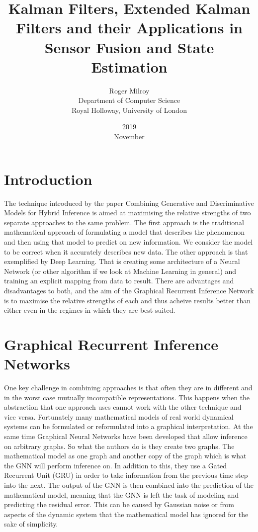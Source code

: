 \documentclass[]{article}
\begin{document}
\title{Kalman Filters, Extended Kalman Filters and their Applications in Sensor Fusion and State Estimation}
\date{2019\\ November}
\author{Roger Milroy\\ Department of Computer Science\\ Royal Holloway, University of London}

\maketitle

\section{Introduction}

The technique introduced by the paper Combining Generative and Discriminative Models for Hybrid Inference \cite{Satorras2019CombiningGA} is aimed at maximising the relative strengths of two separate approaches to the same problem.
The first approach is the traditional mathematical approach of formulating a model that describes the phenomenon and then using that model to predict on new information. We consider the model to be correct when it accurately describes new data.
The other approach is that exemplified by Deep Learning. That is creating some architecture of a Neural Network (or other algorithm if we look at Machine Learning in general) and training an explicit mapping from data to result.
There are advantages and disadvantages to both, and the aim of the Graphical Recurrent Inference Network is to maximise the relative strengths of each and thus acheive results better than either even in the regimes in which they are best suited.


\section{Graphical Recurrent Inference Networks}

One key challenge in combining approaches is that often they are in different and in the worst case mutually incompatible representations. This happens when the abstraction that one approach uses cannot work with the other technique and vice versa.
Fortunately many mathematical models of real world dynamical systems can be formulated or reformulated into a graphical interpretation. At the same time Graphical Neural Networks have been developed that allow inference on arbitrary graphs.
So what the authors do is they create two graphs. The mathematical model as one graph and another copy of the graph which is what the GNN will perform inference on. In addition to this, they use a Gated Recurrent Unit (GRU) in order to take information from the previous time step into the next.
The output of the GNN is then combined into the prediction of the mathematical model, meaning that the GNN is left the task of modeling and predicting the residual error. This can be caused by Gaussian noise or from aspects of the dynamic system that the mathematical model has ignored for the sake of simplicity.
\end{document}

